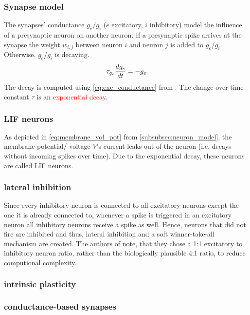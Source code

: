 \subsubsection{Synapse model}
\label{subsubsec:synapse_model}
The synapses' conductance $g_e$/$g_i$ ($e$ excitatory, $i$ inhibitory) model the influence of a presynaptic neuron on another neuron.
If a presynaptic spike arrives at the synapse the weight $w_{i,j}$ between neuron $i$ and neuron $j$ is added to $g_e$/$g_i$.
Otherwise, $g_e$/$g_i$ is decaying.
%
\begin{equation}
    \centering
    \label{eq:exc_conductance}
    \tau_{g_e} \frac{dg_e}{dt} = - g_e
\end{equation}
%
The decay is computed using \autoref{eq:exc_conductance} from \cite{SNN}.
The change over time constant $\tau$ is an \textcolor{red}{exponential decay}.


\subsubsection{\ac{LIF} neurons}
As depicted in \autoref{eq:membrane_vol_pot} from \autoref{subsubsec:neuron_model}, the membrane potential/ voltage $V$'s current leaks out of the neuron (i.e. decays without incoming spikes over time).
Due to the exponential decay, these neurons are called \ac{LIF} neurons.


\subsubsection{lateral inhibition}
Since every inhibitory neuron is connected to all excitatory neurons except the one it is already connected to, whenever a spike is triggered in an excitatory neuron all inhibitory neurons receive a spike as well.
Hence, neurons that did not fire are inhibited and thus, lateral inhibition and a soft winner-take-all mechanism are created.
The authors of \cite{SNN} note, that they chose a 1:1 excitatory to inhibitory neuron ratio, rather than the biologically plausible 4:1 ratio, 
to reduce computional complexity.


\subsubsection{intrinsic plasticity}


\subsubsection{conductance-based synapses}


